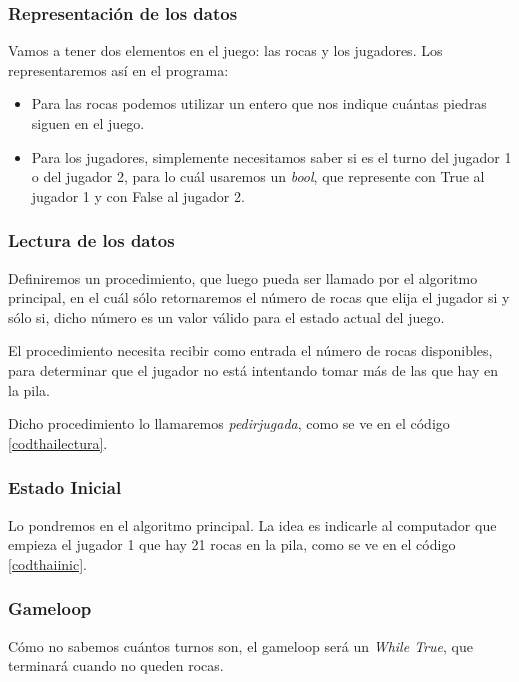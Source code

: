 \subsubsection{Representación de los datos}
Vamos a tener dos elementos en el juego: las rocas y los jugadores. Los representaremos así en el programa:

\begin{itemize}
	\item Para las rocas podemos utilizar un entero que nos indique cuántas piedras siguen en el juego.
	
	\item Para los jugadores, simplemente necesitamos saber si es el turno del jugador 1 o del jugador 2, para lo cuál usaremos un \emph{bool}, que represente con True al jugador 1 y con False al jugador 2.
\end{itemize}


\subsubsection{Lectura de los datos}
Definiremos un procedimiento, que luego pueda ser llamado por el algoritmo principal, en el cuál sólo retornaremos el número de rocas que elija el jugador si y sólo si, dicho número es un valor válido para el estado actual del juego.

El procedimiento necesita recibir como entrada el número de rocas disponibles, para determinar que el jugador no está intentando tomar más de las que hay en la pila. 

Dicho procedimiento lo llamaremos \emph{pedir\textunderscore jugada}, como se ve en el código \ref{codthailectura}. \\



\subsubsection{Estado Inicial}
Lo pondremos en el algoritmo principal. La idea es indicarle al computador que empieza el jugador 1 que hay 21 rocas en la pila, como se ve en el código \ref{codthaiinic}. \\



\subsubsection{Gameloop}
Cómo no sabemos cuántos turnos son, el gameloop será un \emph{While True}, que terminará cuando no queden rocas. 

